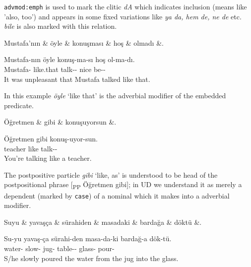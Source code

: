 \documentclass[11pt,a4paper]{article}
\begin{document}
\texttt{advmod:emph} is used to mark the clitic \textit{dA} which indicates inclusion (means like 'also, too') and appears in some fixed variations like \textit{ya da, hem de, ne de} etc. \textit{bile} is also marked with this relation.

\begin{exe}
\ex \label{advmod}
\begin{dependency}
\begin{deptext}[column sep=0.3cm]
Mustafa'nın \& öyle \& konuşması \& hoş \& olmadı \&. \\
\end{deptext}
\end{dependency}
\gll Mustafa-nın öyle konuş-ma-sı hoş ol-ma-dı.  \\
Mustafa-\Gen{} like.that talk-\Neg{}-\Tsg{} nice be-\Neg{}-\Pst{} \\
\glt It was unpleasant that Mustafa talked like that.
\end{exe}

In this example \textit{öyle} ‘like that’ is the adverbial modifier of the embedded predicate.

\begin{exe}
\ex \label{advmod2}
\begin{dependency}
\begin{deptext}[column sep=0.22cm]
Öğretmen \& gibi \& konuşuyorsun \&. \\
\end{deptext}
\end{dependency}
\gll Öğretmen gibi konuş-uyor-sun. \\
teacher like talk-\Prog{}-\Ssg{} \\
\glt You’re talking like a teacher.
\end{exe}

The postpositive particle \textit{gibi} ‘like, as’ is understood to be head of the postpositional phrase [\textsubscript{PP} Öğretmen gibi]; in UD we understand it as merely a dependent (marked by \texttt{case}) of a nominal which it makes into a adverbial modifier.

\begin{exe}
\ex \label{advmod3}
\begin{dependency}
\begin{deptext}[column sep=0.32cm]
Suyu \& yavaşça \& sürahiden \& masadaki \& bardağa \& döktü \&. \\
\end{deptext}
\end{dependency}
\gll Su-yu yavaş-ça sürahi-den masa-da-ki bardağ-a dök-tü.  \\
water-\Acc{} slow-\Adv{} jug-\Abl{} table-\Loc{}-\Adj{} glass-\Dat{} pour-\Pst{} \\
\glt S/he slowly poured the water from the jug into the glass.
\end{exe}
\end{document}
